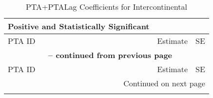 \begin{longtable}{lcc}
    \caption{PTA+PTALag Coefficients for Intercontinental} \label{tab:pta_intercontinental} \\
    
    \hline
    \textbf{Positive and Statistically Significant} &  &  \\
    \hline
    PTA ID & Estimate & SE \\
    \hline
    \endfirsthead
    
    \multicolumn{3}{c}{{\bfseries \tablename\ \thetable{} -- continued from previous page}} \\
    \hline
    PTA ID & Estimate & SE \\
    \hline
    \endhead
    
    \hline \multicolumn{3}{r}{{Continued on next page}} \\ \hline
    \endfoot
    
    \hline
    \endlastfoot
    

\end{longtable}
